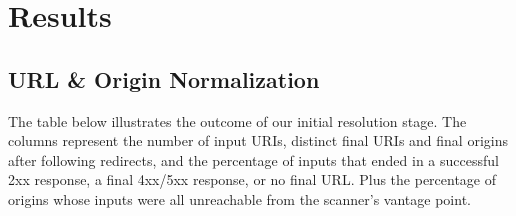 \documentclass[pdflatex,sn-mathphys-num]{sn-jnl}
\numberwithin{equation}{section}
\theoremstyle{thmstyleone}
\theoremstyle{thmstyletwo}%
\theoremstyle{thmstylethree}%
\begin{document}


\section{Results}\label{sec:result}

\subsection{URL \& Origin Normalization}

The table below illustrates the outcome of our initial resolution stage. The columns represent the
number of input URIs, distinct final URIs and final origins after following
redirects, and the percentage of inputs that ended in a successful 2xx
response, a final 4xx/5xx response, or no final URL. Plus the percentage
of origins whose inputs were all unreachable from the scanner's vantage point. 
\end{document}
